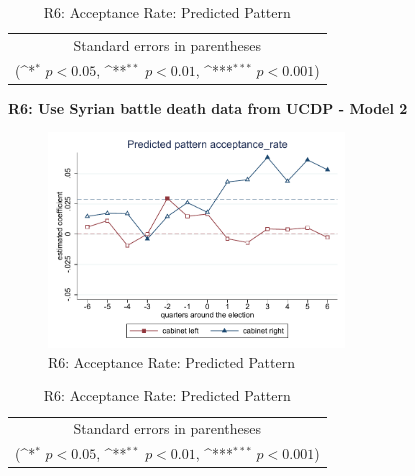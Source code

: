\documentclass[10pt,a4paper]{scrartcl}
\begin{document}
\begin{table}[!ht]\centering
	\renewcommand{\arraystretch}{1.25}
	\def\sym#1{\ifmmode^{#1}\else\(^{#1}\)\fi}
	\caption{R6: Acceptance Rate: Predicted Pattern}
	\begin{tabular}{l*{2}{c}}
		\hline\hline
		
		\hline\hline
		\multicolumn{3}{c}{\footnotesize Standard errors in parentheses} \\
		\multicolumn{3}{c}{\footnotesize (\sym{*} \(p<0.05\), \sym{**} \(p<0.01\), \sym{***} \(p<0.001\))}\\
	\end{tabular}
\end{table}

\clearpage
\textbf{R6: Use Syrian battle death data from UCDP - Model 2}
\begin{figure}[!ht]
	\centering
	\includegraphics[width=0.7\textwidth]{figures_edited/acceptance_rate_graph2_R6.pdf}
	\caption{R6: Acceptance Rate: Predicted Pattern}
\end{figure}

\begin{table}[!ht]\centering
	\footnotesize
	\renewcommand{\arraystretch}{1.2}
	\def\sym#1{\ifmmode^{#1}\else\(^{#1}\)\fi}
	\caption{R6: Acceptance Rate: Predicted Pattern}
	\begin{tabular}{l*{2}{c}}
		\hline\hline
		
		\hline\hline
		\multicolumn{3}{c}{\footnotesize Standard errors in parentheses} \\
		\multicolumn{3}{c}{\footnotesize (\sym{*} \(p<0.05\), \sym{**} \(p<0.01\), \sym{***} \(p<0.001\))} \\
	\end{tabular}
\end{table}
\end{document}
